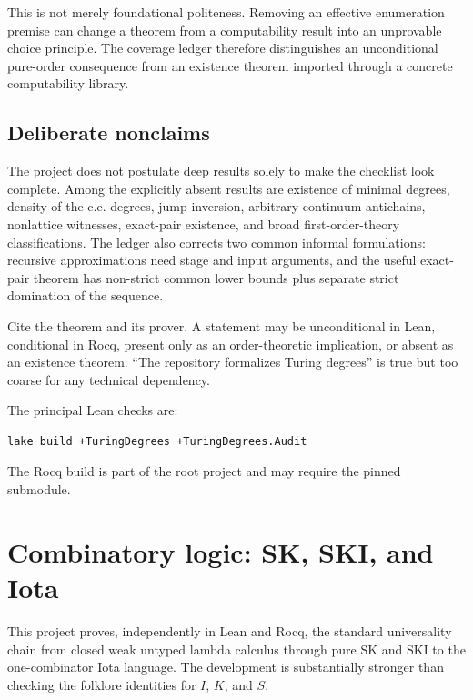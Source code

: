 \documentclass[
  10pt,
  a4paper,
  twoside,
  open=any,
  parskip=half,
  headings=big
]{scrreprt}
\newcommand{\code}[1]{\texttt{\detokenize{#1}}}
\begin{document}
This is not merely foundational politeness. Removing an effective enumeration premise can change a theorem from a computability result into an unprovable choice principle. The coverage ledger therefore distinguishes an unconditional pure-order consequence from an existence theorem imported through a concrete computability library.

\subsection{Deliberate nonclaims}

The project does not postulate deep results solely to make the checklist look complete. Among the explicitly absent results are existence of minimal degrees, density of the c.e. degrees, jump inversion, arbitrary continuum antichains, nonlattice witnesses, exact-pair existence, and broad first-order-theory classifications. The ledger also corrects two common informal formulations: recursive approximations need stage and input arguments, and the useful exact-pair theorem has non-strict common lower bounds plus separate strict domination of the sequence.

\begin{statusbox}
Cite the theorem and its prover. A statement may be unconditional in Lean, conditional in Rocq, present only as an order-theoretic implication, or absent as an existence theorem. ``The repository formalizes Turing degrees'' is true but too coarse for any technical dependency.
\end{statusbox}

The principal Lean checks are:

\begin{lstlisting}[language=bash]
lake build +TuringDegrees +TuringDegrees.Audit
\end{lstlisting}

The Rocq build is part of the root project and may require the pinned \code{coq-synthetic-computability} submodule.

\section{Combinatory logic: SK, SKI, and Iota}
\label{sec:combinatory}

This project proves, independently in Lean and Rocq, the standard universality chain from closed weak untyped lambda calculus through pure SK and SKI to the one-combinator Iota language. The development is substantially stronger than checking the folklore identities for $I$, $K$, and $S$.
\end{document}
